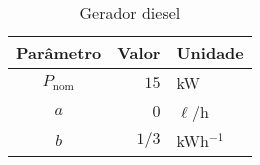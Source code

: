 
\begin{table}[ht]
	\centering
	\caption{Gerador diesel}\label{tbl:diesel}
    \begin{tabular}{c r l}
		\hline
        Parâmetro        &  Valor & Unidade\\
		\hline
		\hline
        $P_{\text{nom}}$ &  $15$   & kW       \\
        $a$              &  $0$   & $\ell$/h   \\
        $b$              &  $1/3$   & {kWh}$^{-1}$    \\
		\hline
	\end{tabular}
\end{table}
